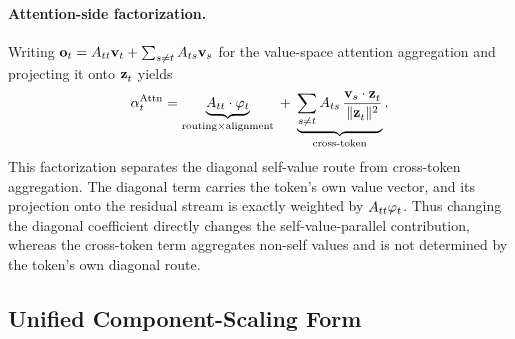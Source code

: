 \paragraph{Attention-side factorization.}
Writing
$\mathbf{o}_t=A_{tt}\mathbf{v}_t+\sum_{s\neq t}A_{ts}\mathbf{v}_s$
for the value-space attention aggregation and projecting it onto $\mathbf{z}^{}_{t}$
yields
\begin{equation}
  \alpha_t^{\mathrm{Attn}}
    = \underbrace{A_{tt}\cdot\varphi_t}_{\text{routing} \times \text{alignment}}
      \;+\; \underbrace{\sum_{s \neq t}A_{ts}\,
            \frac{\mathbf{v}_s\cdot\mathbf{z}^{}_{t}}{\|\mathbf{z}^{}_{t}\|^2}}_{\text{cross-token}}.
  \label{eq:alpha-attn}
\end{equation}
This factorization separates the diagonal self-value route from cross-token
aggregation. The diagonal term carries the token's own value vector, and its
projection onto the residual stream is exactly weighted by
$A_{tt}\varphi_t$. Thus changing the diagonal coefficient directly changes
the self-value-parallel contribution, whereas the cross-token term aggregates
non-self values and is not determined by the token's own diagonal route.

\subsection{Unified Component-Scaling Form}
\label{sec:closed-form-control}

